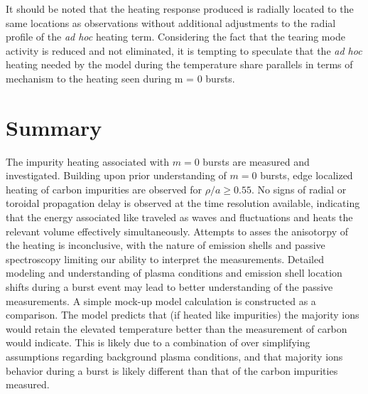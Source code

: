 \begin{refsection}
It should be noted that the heating response produced is radially located to the same locations as observations without additional adjustments to the radial profile of the \textit{ad hoc} heating term. Considering the fact that the tearing mode activity is reduced and not eliminated, it is tempting to speculate that the \textit{ad hoc} heating needed by the model during the temperature share parallels in terms of mechanism to the heating seen during m = 0 bursts.

\section{Summary}

The impurity heating associated with $m = 0$ bursts are measured and investigated. Building upon prior understanding of $m = 0$ bursts, edge localized heating of carbon impurities are observed for $\rho/a \geq 0.55$. No signs of radial or toroidal propagation delay is observed at the time resolution available, indicating that the energy associated like traveled as waves and fluctuations and heats the relevant volume effectively simultaneously. Attempts to asses the anisotorpy of the heating is inconclusive, with the nature of emission shells and passive spectroscopy limiting our ability to interpret the measurements. Detailed modeling and understanding of plasma conditions and emission shell location shifts during a burst event may lead to better understanding of the passive measurements. A simple mock-up model calculation is constructed as a comparison. The model predicts that (if heated like impurities) the majority ions would retain the elevated temperature better than the measurement of carbon would indicate. This is likely due to a combination of over simplifying assumptions regarding background plasma conditions, and that majority ions behavior during a burst is likely different than that of the carbon impurities measured. 


\printbibliography%
\end{refsection}
